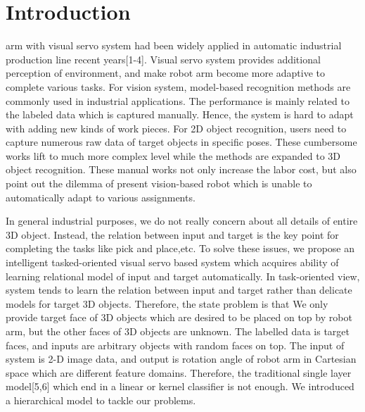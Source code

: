 \documentclass[journal]{IEEEtran}
\begin{document}
%
\IEEEpeerreviewmaketitle



\section{Introduction}


% 
% 
% 
% 
 arm with visual servo system had been widely applied in automatic industrial production line recent years[1-4]. Visual servo system provides additional perception of environment, and make robot arm become more adaptive to complete various tasks. For vision system, model-based recognition methods are commonly used in industrial applications. The performance is mainly related to the labeled data which is captured manually. Hence, the system is hard to adapt with adding new kinds of work pieces. For 2D object recognition, users need to capture numerous raw data of target objects in specific poses. These cumbersome works lift to much more complex level while the methods are expanded to 3D object recognition. These manual works not only increase the labor cost, but also point out the dilemma of present vision-based robot which is unable to automatically adapt to various assignments. 

In general industrial purposes, we do not really concern about all details of entire 3D object. Instead, the relation between input and target is the key point for completing the tasks like pick and place,etc. To solve these issues, we propose an intelligent tasked-oriented visual servo based system which acquires ability of learning relational model of input and target automatically. In task-oriented view, system tends to learn the relation between input and target rather than delicate models for target 3D objects. Therefore, the state problem is that We only provide target face of 3D objects which are desired to be placed on top by robot arm, but the other faces of 3D objects are unknown. The labelled data is target faces, and inputs are arbitrary objects with random faces on top. The input of system is 2-D image data, and output is rotation angle of robot arm in Cartesian space which are different feature domains. Therefore, the traditional single layer model[5,6] which end in a linear or kernel classifier is not enough. We introduced a hierarchical model to tackle our problems. 
\end{document}
